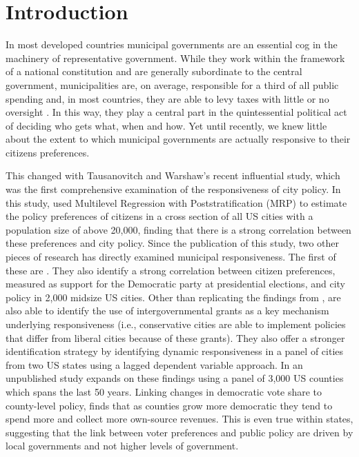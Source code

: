 \documentclass[a4paper,12pt]{article}
\begin{document}
	
	
\section{Introduction}

In most developed countries municipal governments are an essential cog in the machinery of representative government. While they work within the framework of a national constitution and are generally subordinate to the central government, municipalities are, on average, responsible for a third of all public spending and, in most countries, they are able to levy taxes with little or no oversight \cite{oecd2016subnational}. In this way, they play a central part in the quintessential political act of deciding who gets what, when and how.  Yet until recently, we knew little about the extent to which municipal governments are actually responsive to their citizens preferences.


This changed with Tausanovitch and Warshaw's \citeyear{tausanovitch2014representation} recent influential study, which  was the first comprehensive examination of the responsiveness of city policy. In this study, \citeauthor{tausanovitch2014representation} used Multilevel Regression with Poststratification (MRP) to estimate the policy preferences of citizens in a cross section of all US cities with a population size of above 20,000, finding that there is a strong correlation between these preferences and city policy. Since the publication of this study, two other pieces of research has directly examined municipal responsiveness. The first of these are \cite{einstein2016pushing}. They also identify a strong correlation between citizen preferences, measured as support for the Democratic party at presidential elections,  and city policy in 2,000 midsize US cities. Other than replicating the findings from \citeauthor{tausanovitch2014representation}, \citeauthor{einstein2016pushing} are also able to identify the use of intergovernmental grants as a key mechanism underlying responsiveness (i.e., conservative cities are able to implement policies that differ from liberal cities because of these grants). They also offer a stronger identification strategy by identifying dynamic responsiveness \citep[cf.][]{stimson1995dynamic} in a panel of cities from two US states using a lagged dependent variable approach. In an unpublished study \cite{sances2017voters} expands on these findings using a panel of 3,000 US counties which spans the last 50 years. Linking changes in democratic vote share to county-level policy, \citeauthor{sances2017voters} finds that as counties grow more democratic they tend to spend more and collect more own-source revenues. This is even true within states, suggesting that the link between voter preferences and public policy are driven by local governments and not higher levels of government.
\end{document}
